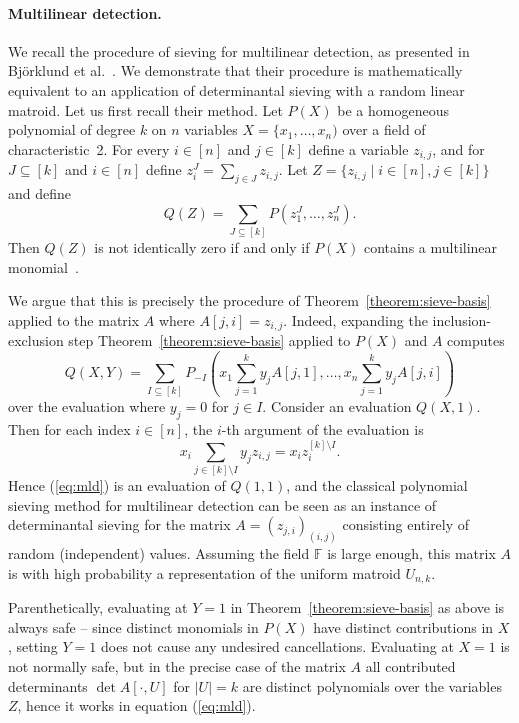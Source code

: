 \documentclass{theoretics}
\newcommand{\F}{\ensuremath{\mathbb F}\xspace}
\begin{document}
\paragraph{Multilinear detection.} 
We recall the procedure of sieving for multilinear detection, as
presented in Björklund et al.~\cite{BjorklundKK16}.
We demonstrate that their procedure is mathematically equivalent
to an application of determinantal sieving with a random linear matroid.
Let us first recall their method. 
Let $P(X)$ be a homogeneous polynomial of degree $k$ on $n$ variables
$X=\{x_1,\ldots,x_n)$ over a field of characteristic~2. For every $i \in [n]$ and $j \in [k]$ define a
variable $z_{i,j}$, and for $J \subseteq [k]$ and $i \in [n]$
define $z_i^J=\sum_{j \in J} z_{i,j}$.
Let $Z=\{z_{i,j} \mid i \in [n], j \in [k]\}$ and define
\begin{equation}
  Q(Z) = \sum_{J \subseteq [k]} P(z_1^J, \ldots, z_n^J).
  \label{eq:mld}
\end{equation}
Then $Q(Z)$ is not identically zero if and only if $P(X)$ contains a
multilinear monomial~\cite{BjorklundKK16}.

We argue that this is precisely the procedure of Theorem~\ref{theorem:sieve-basis}
applied to the matrix $A$ where $A[j,i]=z_{i,j}$.
Indeed, expanding the inclusion-exclusion step Theorem~\ref{theorem:sieve-basis}
applied to $P(X)$ and $A$
computes
\[
  Q(X,Y) = \sum_{I \subseteq [k]} P_{-I}(x_1 \sum_{j=1}^k y_j A[j,1], \ldots, x_n \sum_{j=1}^k y_j A[j,i])
\]
over the evaluation where $y_j=0$ for $j \in I$. Consider an evaluation $Q(X,1)$.
Then for each index $i \in [n]$, the $i$-th argument of the evaluation is
\[
  x_i \sum_{j \in [k] \setminus I}  y_j z_{i,j} = x_i z_i^{[k] \setminus I}.
\]
Hence (\ref{eq:mld}) is an evaluation of $Q(1,1)$,
and the classical polynomial sieving method for multilinear detection 
can be seen as an instance of determinantal sieving for the matrix $A=(z_{j,i})_{(i,j)}$
consisting entirely of random (independent) values.
Assuming the field $\F$ is large enough, this matrix $A$ is with high
probability a representation of the uniform matroid $U_{n,k}$.

Parenthetically, evaluating at $Y =1$ in Theorem~\ref{theorem:sieve-basis}
as above is always safe -- since distinct monomials in $P(X)$ have
distinct contributions in $X$, setting $Y=1$ does not cause any
undesired cancellations. Evaluating at $X=1$ is not normally safe,
but in the precise case of the matrix $A$ all contributed determinants
$\det A[\cdot,U]$ for $|U|=k$ are distinct polynomials over the
variables $Z$, hence it works in equation (\ref{eq:mld}).
\end{document}
